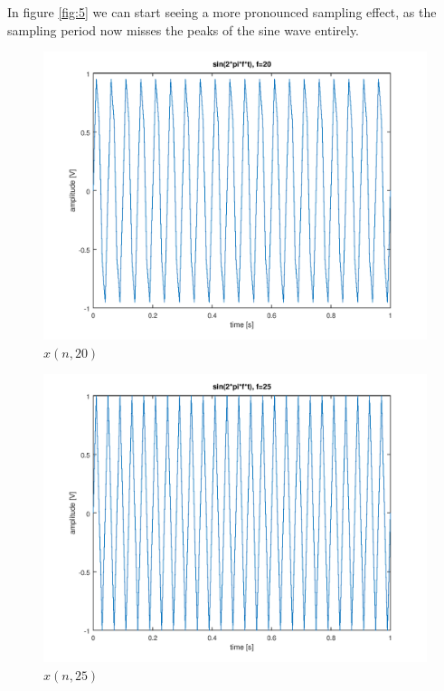 \documentclass[a4paper, 12pt]{report}
\begin{document}
			In figure \ref{fig:5} we can start seeing a more pronounced sampling effect, as the sampling period now misses the peaks of the sine wave entirely.

			\begin{figure}[H]
				\includegraphics[width=\textwidth]{img/1_6.png}
				\caption{$x(n, 20)$}
				\label{fig:6}
			\end{figure}

			\begin{figure}[H]
				\includegraphics[width=\textwidth]{img/1_7.png}
				\caption{$x(n, 25)$}
				\label{fig:7}
			\end{figure}
\end{document}
